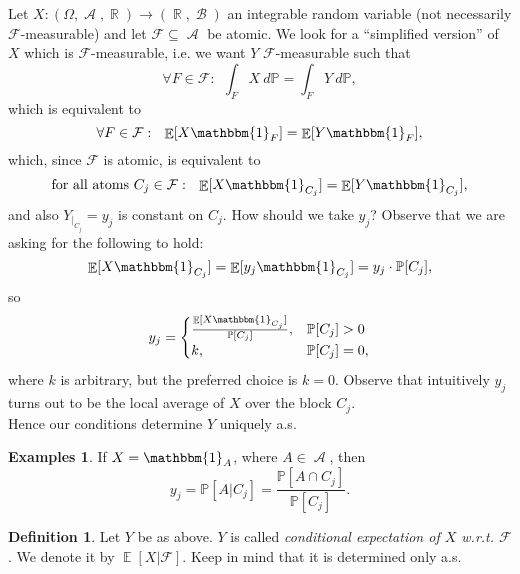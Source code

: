 \documentclass[12pt,a4paper]{report}
\theoremstyle{definition}
\newtheorem{definition}[theorem]{Definition}
\newtheorem*{examples}{Examples}
\theoremstyle{num.custom-title}
\DeclareMathOperator{\A}{\mathcal{A}}
\DeclareMathOperator{\B}{\mathcal{B}}
\DeclareMathOperator{\E}{\mathbb{E}}
\DeclareMathOperator{\R}{\mathbb{R}}
\DeclareMathOperator{\sse}{\subseteq}
\newcommand{\F}{\mathcal{F}}
\renewcommand{\1}{\mathbbm{1}}
\renewcommand{\P}{\mathbb{P}}
\begin{document}
Let $X \colon (\Omega,\A,\R) \to (\R,\B)$ an integrable random variable (not necessarily $\F$-measurable) and let $\F \sse \A$ be atomic. We look for a ``simplified version'' of $X$ which is $\F$-measurable, i.e. we want $Y$ $\F$-measurable such that
\[
\forall F \in \F: \ \ \int_F X \ d\P = \int_F Y \ d\P,
\]
which is equivalent to
\[
\forall F \in \F: \ \ \E[X \1_F] = \E[Y \1_F],
\]
which, since $\F$ is atomic, is equivalent to
\[
\text{for all atoms } C_j \in \F: \ \ \E[X \1_{C_j}] = \E[Y \1_{C_j}],
\]
and also $Y_{|_{C_j}} = y_j$ is constant on $C_j$. How should we take $y_j$? Observe that we are asking for the following to hold:
\[
\E[X \1_{C_j}] = \E[y_j \1_{C_j}] = y_j \cdot \P[C_j],
\]
so
\[
y_j =
\begin{cases}
\frac{\E[X \1_{C_j}]}{\P[C_j]}, & \P[C_j] > 0 \\
k, & \P[C_j]=0,
\end{cases}
\]
where $k$ is arbitrary, but the preferred choice is $k=0$. Observe that intuitively $y_j$ turns out to be the local average of $X$ over the block $C_j$.\\
Hence our conditions determine $Y$ uniquely a.s.

\begin{examples}
If $X = \1_A$, where $A \in \A$, then
\[
y_j = \P[A|C_j] = \frac{\P[A \cap C_j]}{\P[C_j]}.
\]
\end{examples}

\begin{definition}
Let $Y$ be as above. $Y$ is called \emph{conditional expectation of $X$ w.r.t. $\F$}. We denote it by $\E[X|\F]$. Keep in mind that it is determined only a.s.
\end{definition}
\end{document}
